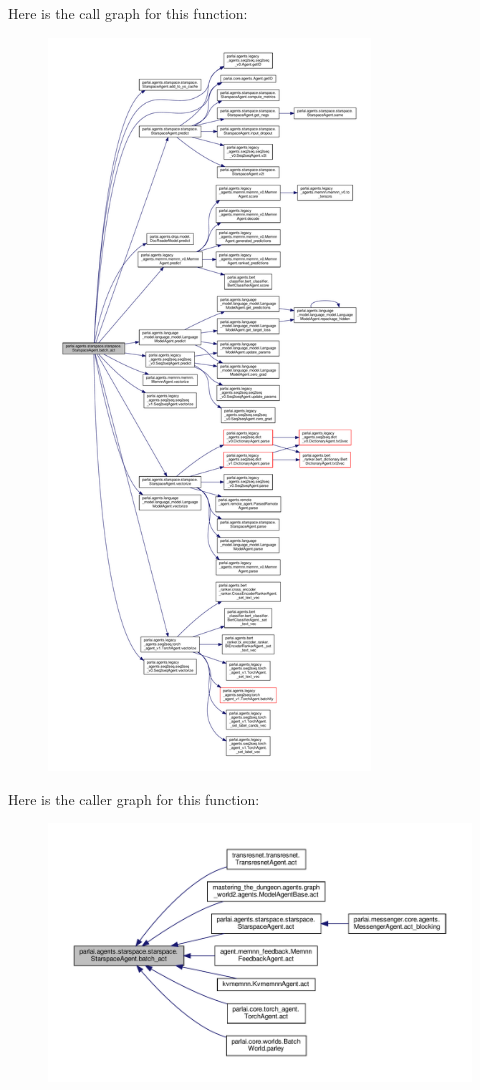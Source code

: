 Here is the call graph for this function\+:
\nopagebreak
\begin{figure}[H]
\begin{center}
\leavevmode
\includegraphics[height=550pt]{classparlai_1_1agents_1_1starspace_1_1starspace_1_1StarspaceAgent_a426f2fb245c6a0a409365c4662aec2d2_cgraph}
\end{center}
\end{figure}
Here is the caller graph for this function\+:
\nopagebreak
\begin{figure}[H]
\begin{center}
\leavevmode
\includegraphics[width=350pt]{classparlai_1_1agents_1_1starspace_1_1starspace_1_1StarspaceAgent_a426f2fb245c6a0a409365c4662aec2d2_icgraph}
\end{center}
\end{figure}
